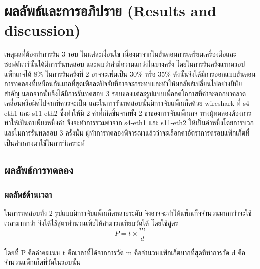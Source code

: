 \section{ผลลัพธ์และการอภิปราย (Results and discussion)}
เหตุผลที่ต้องทำการรัน 3 รอบ ในแต่ละเงื่อนไข เนื่องมาจากในขั้นตอนการเตรียมเครื่องมือและซอฟต์แวร์นั้นได้มีการรันทดสอบ และพบว่าค่ามีความแกว่งในบางครั้ง โดยในการรันครั้งแรกดรอปแพ็กเกจได้ 8\% ในการรันครั้งที่ 2 อาจจะเพิ่มเป็น 30\% หรือ 35\% 
ดังนั้นจึงได้มีการออกแบบขั้นตอนการทดลองที่เหมือนกันมากที่สุดเพื่อลดปัจจัยที่อาจจะกระทบและทำให้ผลลัพธ์เปลี่ยนไปอย่างมีนัยสำคัญ นอกจากนั้นจึงได้มีการรันทดสอบ 3 รอบของแต่ละรูปแบบเพื่อลดโอกาสที่ค่าจะออกมาคลาดเคลื่อนหรือผิดไปจากที่ควรจะเป็น 
และในการรันทดสอบนั้นมีการจับแพ็กเก็ตด้วย wireshark ที่ s4-eth1 และ s11-eth2 ซึ่งทำให้มี 2 ค่าที่เกิดขึ้นจากทั้ง 2 ขาของการจับแพ็กเกจ ทางผู้ทดลองต้องการทำให้เป็นค่าเพียงหนึ่งค่า
จึงจะทำการรวมค่าจาก s4-eth1 และ s11-eth2 ให้เป็นค่าหนึ่งโดยการบวก และในการรันทดสอบ 3 ครั้งนั้น 
ผู้ทำการทดลองพิจารณาแล้วว่าจะเลือกค่าอัตราการดรอบแพ็กเก็ตที่เป็นค่ากลางมาใช้ในการวิเคราะห์
\\
\subsection{ผลลัพธ์การทดลอง}
\subsubsection*{ผลลัพธ์ด้านเวลา}

%
%
ในการทดสอบทั้ง 2 รูปแบบมีการจับแพ็กเก็ตหลายระดับ จึงอาจจะทำให้แพ็กเก็จจำนวนมากกว่าจะใช้เวลามากกว่า
จึงได้ใช้สูตรคำนวนเพื่อให้สามารถเทียบวัดได้ โดยใช้สูตร
$$P=t \times \frac{m}{d}$$

โดยที่ P คือค่าคะแนน t คือเวลาที่ได้จากการวัด m คือจำนวนแพ็กเก็ตมากที่สุดที่ทำการวัด d คือจำนวนแพ็กเก็ตที่วัดในรอบนั้น

